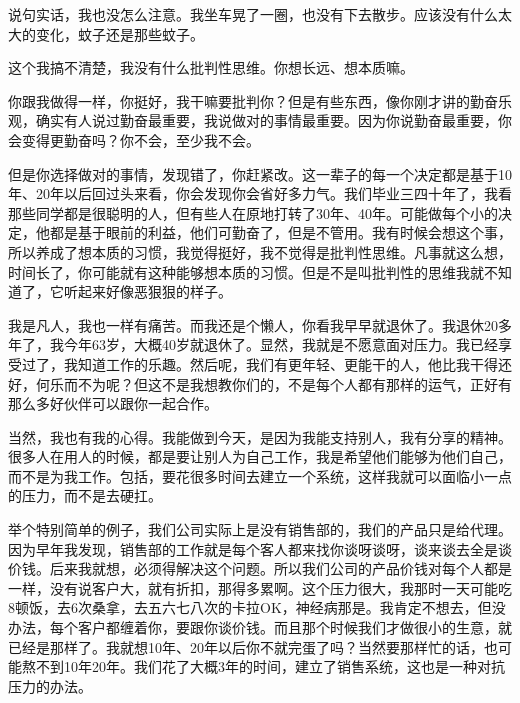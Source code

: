 说句实话，我也没怎么注意。我坐车晃了一圈，也没有下去散步。应该没有什么太大的变化，蚊子还是那些蚊子。



这个我搞不清楚，我没有什么批判性思维。你想长远、想本质嘛。

你跟我做得一样，你挺好，我干嘛要批判你？但是有些东西，像你刚才讲的勤奋乐观，确实有人说过勤奋最重要，我说做对的事情最重要。因为你说勤奋最重要，你会变得更勤奋吗？你不会，至少我不会。

但是你选择做对的事情，发现错了，你赶紧改。这一辈子的每一个决定都是基于10年、20年以后回过头来看，你会发现你会省好多力气。我们毕业三四十年了，我看那些同学都是很聪明的人，但有些人在原地打转了30年、40年。可能做每个小的决定，他都是基于眼前的利益，他们可勤奋了，但是不管用。我有时候会想这个事，所以养成了想本质的习惯，我觉得挺好，我不觉得是批判性思维。凡事就这么想，时间长了，你可能就有这种能够想本质的习惯。但是不是叫批判性的思维我就不知道了，它听起来好像恶狠狠的样子。



我是凡人，我也一样有痛苦。而我还是个懒人，你看我早早就退休了。我退休20多年了，我今年63岁，大概40岁就退休了。显然，我就是不愿意面对压力。我已经享受过了，我知道工作的乐趣。然后呢，我们有更年轻、更能干的人，他比我干得还好，何乐而不为呢？但这不是我想教你们的，不是每个人都有那样的运气，正好有那么多好伙伴可以跟你一起合作。

当然，我也有我的心得。我能做到今天，是因为我能支持别人，我有分享的精神。很多人在用人的时候，都是要让别人为自己工作，我是希望他们能够为他们自己，而不是为我工作。包括，要花很多时间去建立一个系统，这样我就可以面临小一点的压力，而不是去硬扛。

举个特别简单的例子，我们公司实际上是没有销售部的，我们的产品只是给代理。因为早年我发现，销售部的工作就是每个客人都来找你谈呀谈呀，谈来谈去全是谈价钱。后来我就想，必须得解决这个问题。所以我们公司的产品价钱对每个人都是一样，没有说客户大，就有折扣，那得多累啊。这个压力很大，我那时一天可能吃8顿饭，去6次桑拿，去五六七八次的卡拉OK，神经病那是。我肯定不想去，但没办法，每个客户都缠着你，要跟你谈价钱。而且那个时候我们才做很小的生意，就已经是那样了。我就想10年、20年以后你不就完蛋了吗？当然要那样忙的话，也可能熬不到10年20年。我们花了大概3年的时间，建立了销售系统，这也是一种对抗压力的办法。

